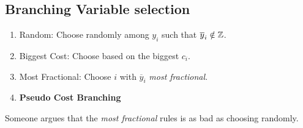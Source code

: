 \subsection{Branching Variable selection}\label{subsec:branching-variable-selection}
\begin{enumerate}
	\item Random: Choose randomly among \(y_{i}\) such that \(\overline{y}_{i}\notin\mathbb{\MakeUppercase{Z}}\).
	\item Biggest Cost: Choose based on the biggest \(c_{i}\).
	\item Most Fractional: Choose \(i\) with \(\overline{y}_{i}\) \emph{most fractional}.
	\item \textbf{Pseudo Cost Branching}
\end{enumerate}

\begin{note}
	Someone argues that the \emph{most fractional} rules is as bad as choosing randomly.
\end{note}
